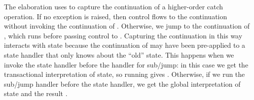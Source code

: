 %
The elaboration uses  to capture the continuation of a higher-order \ac{catch} operation.
If no exception is raised, then control flows to the continuation  without invoking the continuation of .
Otherwise, we jump to the continuation of , which runs  before passing control to .
Capturing the continuation in this way interacts with state because the continuation of  may have been pre-applied to a state handler that only knows about the ``old'' state.
This happens when we invoke the state handler before the handler for sub/jump: in this case we get the transactional interpretation of state, so running  gives .
Otherwise, if we run the sub/jump handler before the state handler, we get the global interpretation of state and the result .
%
\begin{code}[hide]%
%
\>[6]\<%
\\
%
\>[6]\<%
\\
%
\>[6]\<%
\\
%
\\[\AgdaEmptyExtraSkip]%
\>[0][@{}l@{\AgdaIndent{3}}]%
\>[4]\AgdaSpace{}%
\AgdaModule{\AgdaUnderscore{}}\AgdaSpace{}%
\<%
\\
\>[4][@{}l@{\AgdaIndent{0}}]%
\>[6]\AgdaSpace{}%
\AgdaSpace{}%
\AgdaSpace{}%
\AgdaSymbol{(}\AgdaSymbol{;}\AgdaSpace{}%
\AgdaOperator{\AgdaFunction{\AgdaUnderscore{}>>\AgdaUnderscore{}}}\AgdaSymbol{)}\<%
\\
%
\>[6]\AgdaSpace{}%
\AgdaSpace{}%
\AgdaSpace{}%
\AgdaSpace{}%
\AgdaSymbol{(}\AgdaSymbol{;}\AgdaSpace{}%
\AgdaOperator{\AgdaPrimitive{\AgdaUnderscore{}+\AgdaUnderscore{}}}\AgdaSymbol{)}\<%
\\
%
\>[6]\AgdaSpace{}%
\AgdaSpace{}%
\AgdaSpace{}%
\AgdaSpace{}%
\<%
\\
\>[0]\<%
\\
%
\>[6]%
\>[1832I]\AgdaSymbol{:}\AgdaSpace{}%
\AgdaSpace{}%
\AgdaSpace{}%
\AgdaSymbol{:}\AgdaSpace{}%
\AgdaSpace{}%
\<%
\\

\end{code}
